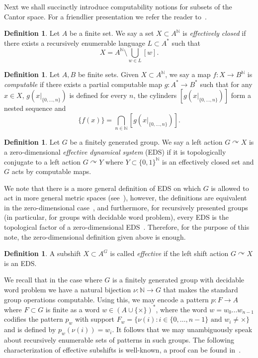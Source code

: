 \documentclass{article}
\theoremstyle{definition}
\newtheorem{definition}[theorem]{Definition}
\theoremstyle{plain}
\newcommand{\NN}{\mathbb{N}}
\newcommand{\define}[1]{\textit{#1}}
\begin{document}
Next we shall succinctly introduce computability notions for subsets of the Cantor space. For a friendlier presentation we refer the reader to~\cite{BarCarRoj2025}.

\begin{definition}
    Let $A$ be a finite set. We say a set $X\subset A^{\NN}$ is \define{effectively closed} if there exists a recursively enumerable language $L\subset A^*$ such that \[ X = A^{\NN}\setminus \bigcup_{w \in L}[w].  \]
\end{definition}

\begin{definition}
    Let $A,B$ be finite sets. Given $X\subset A^{\NN}$, we say a map $f\colon X \to B^{\NN}$ is \define{computable} if there exists a partial computable map $g \colon A^* \to B^*$ such that for any $x \in X$, $g(x|_{\{0,\dots,n\}})$ is defined for every $n$, the cylinders $[g(x|_{\{0,\dots,n\}})]$ form a nested sequence and \[ \{f(x)\}  = \bigcap_{n \in \NN} [g(x|_{\{0,\dots,n\}})]. \]
\end{definition}

\begin{definition}
    Let $G$ be a finitely generated group. We say a left action $G\curvearrowright X$ is a zero-dimensional \define{effective dynamical system} (EDS) if it is topologically conjugate to a left action $G\curvearrowright Y$ where $Y\subset \{0,1\}^{\NN}$ is an effectively closed set and $G$ acts by computable maps.
\end{definition}

We note that there is a more general definition of EDS on which $G$ is allowed to act in more general metric spaces (see~\cite[Definition 3.25]{BarCarRoj2025}), however, the definitions are equivalent in the zero-dimensional case~\cite[Proposition 4.10]{BarCarRoj2025}, and furthermore, for recursively presented groups (in particular, for groups with decidable word problem), every EDS is the topological factor of a zero-dimensional EDS~\cite[Theorem A]{BarCarRoj2025}. Therefore, for the purpose of this note, the zero-dimensional definition given above is enough.

\begin{definition}
    A subshift $X\subset A^G$ is called \define{effective} if the left shift action $G\curvearrowright X$ is an EDS.
\end{definition}

We recall that in the case where $G$ is a finitely generated group with decidable word problem we have a natural bijection $\nu\colon \NN \to G$ that makes the standard group operations computable. Using this, we may encode a pattern $p\colon F \to A$ where $F\subset G$ is finite as a word $w \in (A\cup \{\times\})^*$, where the word $w = w_0\dots w_{n-1}$ codifies the pattern $p_w$ with support $F_w= \{\nu(i) : i \in \{0,\dots,n-1\} \mbox{ and } w_i \neq \times\}$ and is defined by $p_w(\nu(i))=w_i$. It follows that we may unambiguously speak about recursively enumerable sets of patterns in such groups. The following characterization of effective subshifts is well-known, a proof can be found in~\cite[Corollary 7.7]{BarCarRoj2025}.
\end{document}
